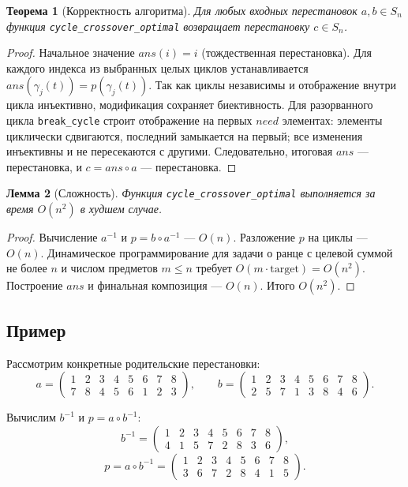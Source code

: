 \documentclass[732]{studrep}
\newcommand{\ans}{\mathit{ans}}          %
\newcommand{\need}{\mathit{need}}        %
\newtheorem{theorem}{Теорема}[section]
\newtheorem{lemma}[theorem]{Лемма}
\theoremstyle{nonumberplain}
\newtheorem{proof}{Доказательство}
\begin{document}
\begin{theorem}[Корректность алгоритма]\label{thm:correctness}
Для любых входных перестановок $a,b\in S_n$ функция \texttt{cycle\_crossover\_optimal} возвращает перестановку $c\in S_n$.
\end{theorem}
\begin{proof}
Начальное значение $\ans(i)=i$ (тождественная перестановка). Для каждого индекса из выбранных целых циклов устанавливается $\ans(\gamma_j(t)) = p(\gamma_j(t))$. Так как циклы независимы и отображение внутри цикла инъективно, модификация сохраняет биективность. Для разорванного цикла \texttt{break\_cycle} строит отображение на первых $\need$ элементах: элементы циклически сдвигаются, последний замыкается на первый; все изменения инъективны и не пересекаются с другими. Следовательно, итоговая $\ans$ — перестановка, и $c = \ans\circ a$ — перестановка.
\end{proof}

\begin{lemma}[Сложность]\label{lem:complexity}
Функция \texttt{cycle\_crossover\_optimal} выполняется за время $O(n^2)$ в худшем случае.
\end{lemma}
\begin{proof}
Вычисление $a^{-1}$ и $p = b\circ a^{-1}$ — $O(n)$. Разложение $p$ на циклы — $O(n)$. Динамическое программирование для задачи о ранце с целевой суммой не более $n$ и числом предметов $m\le n$ требует $O(m \cdot \text{target}) = O(n^2)$. Построение $\ans$ и финальная композиция — $O(n)$. Итого $O(n^2)$.
\end{proof}

\subsection{Пример}
\label{sec:example}

Рассмотрим конкретные родительские перестановки:
\[
a = \begin{pmatrix}
1 & 2 & 3 & 4 & 5 & 6 & 7 & 8\\
7 & 8 & 4 & 5 & 6 & 1 & 2 & 3
\end{pmatrix},\qquad
b = \begin{pmatrix}
1 & 2 & 3 & 4 & 5 & 6 & 7 & 8\\
2 & 5 & 7 & 1 & 3 & 8 & 4 & 6
\end{pmatrix}.
\]

Вычислим $b^{-1}$ и $p = a\circ b^{-1}$:
\[
b^{-1} = \begin{pmatrix}
1 & 2 & 3 & 4 & 5 & 6 & 7 & 8\\
4 & 1 & 5 & 7 & 2 & 8 & 3 & 6
\end{pmatrix},
\]
\[
p = a\circ b^{-1} = \begin{pmatrix}
1 & 2 & 3 & 4 & 5 & 6 & 7 & 8\\
3 & 6 & 7 & 2 & 8 & 4 & 1 & 5
\end{pmatrix}.
\]
\end{document}

